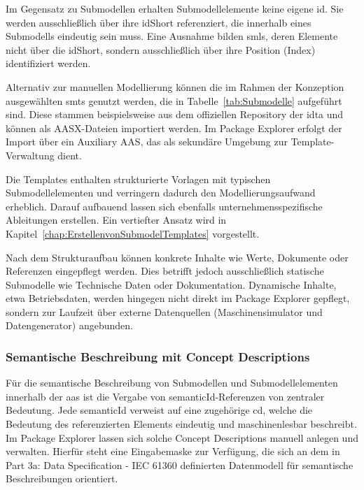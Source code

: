 Im Gegensatz zu Submodellen erhalten Submodellelemente keine eigene \acs{id}.
Sie werden ausschließlich über ihre idShort referenziert, die innerhalb eines Submodells eindeutig sein muss.
Eine Ausnahme bilden \acsp{sml}, deren Elemente nicht über die idShort, sondern ausschließlich über ihre Position (Index) identifiziert werden.

Alternativ zur manuellen Modellierung können die im Rahmen der Konzeption ausgewählten \acsp{smt} genutzt werden, die in Tabelle~\ref{tab:Submodelle} aufgeführt sind.
Diese stammen beispielsweise aus dem offiziellen Repository der \acs{idta} \cite{idtaTemplates} und können als AASX-Dateien importiert werden.
Im Package Explorer erfolgt der Import über ein Auxiliary AAS, das als sekundäre Umgebung zur Template-Verwaltung dient.

Die Templates enthalten strukturierte Vorlagen mit typischen Submodellelementen und verringern dadurch den Modellierungsaufwand erheblich.
Darauf aufbauend lassen sich ebenfalls unternehmensspezifische Ableitungen erstellen.
Ein vertiefter Ansatz wird in Kapitel~\ref{chap:ErstellenvonSubmodelTemplates} vorgestellt.

Nach dem Strukturaufbau können konkrete Inhalte wie Werte, Dokumente oder Referenzen eingepflegt werden.
Dies betrifft jedoch ausschließlich statische Submodelle wie Technische Daten oder Dokumentation.
Dynamische Inhalte, etwa Betriebsdaten, werden hingegen nicht direkt im Package Explorer gepflegt, sondern zur Laufzeit über externe Datenquellen (Maschinensimulator und Datengenerator) angebunden.

\subsubsection*{Semantische Beschreibung mit Concept Descriptions}
\vspace{-0.5em}

Für die semantische Beschreibung von Submodellen und Submodellelementen innerhalb der \acs{aas} ist die Vergabe von semanticId-Referenzen von zentraler Bedeutung.
Jede \mbox{semanticId} verweist auf eine zugehörige \acs{cd}, welche die Bedeutung des referenzierten Elements eindeutig und maschinenlesbar beschreibt.
Im Package Explorer lassen sich solche Concept Descriptions manuell anlegen und verwalten.
Hierfür steht eine Eingabemaske zur Verfügung, die sich an dem in Part 3a: Data Specification - IEC 61360 \cite{SpezifikationPart3a} definierten Datenmodell für semantische Beschreibungen orientiert.

